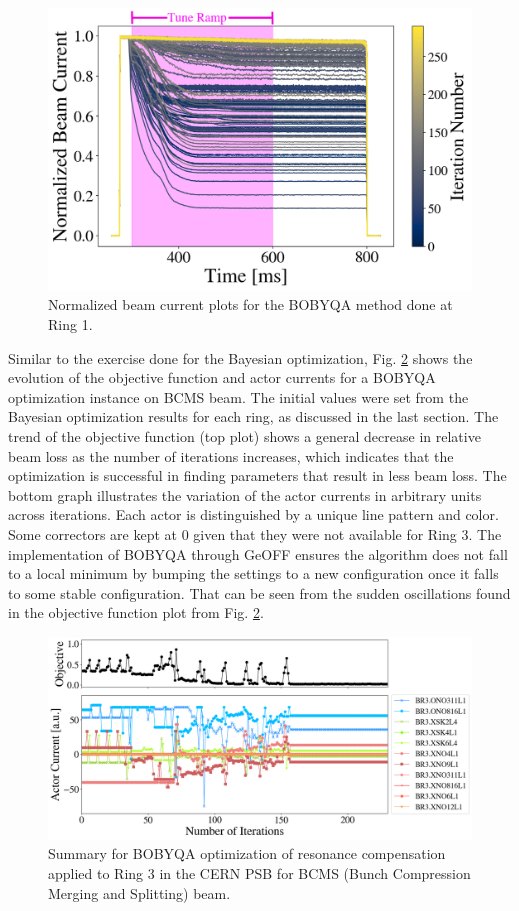 \begin{figure}[H]
    \centering
    \includegraphics[width=\linewidth]{chapter5/i2_bobyqa_commented.png}
    \caption{Normalized beam current plots for the BOBYQA method done at Ring 1.}
    \label{fig:ibobyqa}
\end{figure}

Similar to the exercise done for the Bayesian optimization, Fig. \ref{fig:bobyqa1} shows the evolution of the objective function and actor currents for a BOBYQA optimization instance on BCMS beam. The initial values were set from the Bayesian optimization results for each ring, as discussed in the last section. The trend of the objective function (top plot) shows a general decrease in relative beam loss as the number of iterations increases, which indicates that the optimization is successful in finding parameters that result in less beam loss. The bottom graph illustrates the variation of the actor currents in arbitrary units across iterations. Each actor is distinguished by a unique line pattern and color. Some correctors are kept at 0 given that they were not available for Ring 3. The implementation of BOBYQA through GeOFF ensures the algorithm does not fall to a local minimum by bumping the settings to a new configuration once it falls to some stable configuration. That can be seen from the sudden oscillations found in the objective function plot from Fig. \ref{fig:bobyqa1}.  

\begin{figure}[H]
    \centering
    \includegraphics[width=\linewidth]{chapter5/2023_05_04_R3_BCMS_bobyqa.png}
    \caption{Summary for BOBYQA optimization of resonance compensation applied to Ring 3 in the CERN PSB for BCMS (Bunch Compression Merging and Splitting) beam.}
    \label{fig:bobyqa1}
\end{figure}

